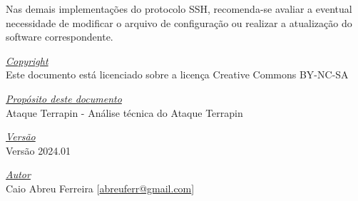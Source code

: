 \documentclass[12pt]{article}
\begin{document}
Nas demais implementações do protocolo SSH, recomenda-se avaliar a eventual necessidade de modificar o arquivo de configuração ou realizar a atualização do software correspondente.

\pagebreak

\vspace*{\fill}
\begin{flushright}
	\underline{\textit{Copyright}}\\
	Este documento está licenciado sobre a licença Creative Commons BY-NC-SA\bigskip

	\underline{\textit{Propósito deste documento}}\\
	Ataque Terrapin - Análise técnica do Ataque Terrapin\bigskip

	\underline{\textit{Versão}}\\
	Versão 2024.01\bigskip

	\underline{\textit{Autor}}\\
	Caio Abreu Ferreira [\href{mailto:abreuferr@gmail.com}{abreuferr@gmail.com}] \bigskip\\
\end{flushright}
\end{document}
